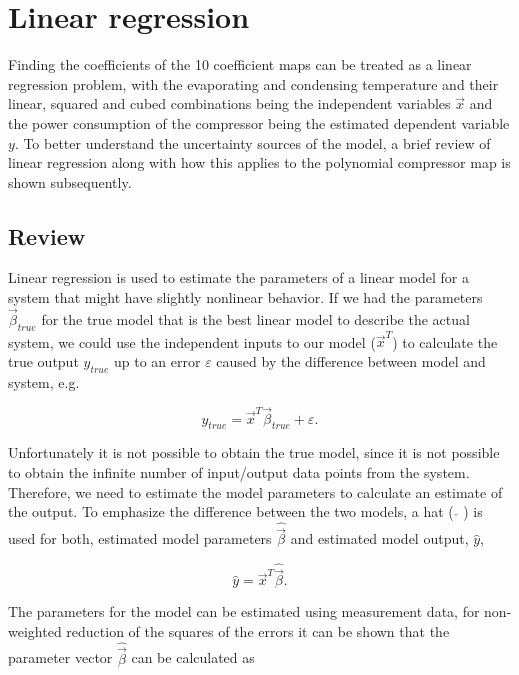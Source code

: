 \section{Linear regression}
\label{sec:linear_regression}
Finding the coefficients of the 10 coefficient maps can be treated as a linear regression problem, with the evaporating and condensing temperature and their linear, squared and cubed combinations being the independent variables ${\vec x}$ and the power consumption of the compressor being the estimated dependent variable $y$. To better understand the uncertainty sources of the model, a brief review of linear regression along with how this applies to the polynomial compressor map is shown subsequently.

\subsection{Review}
\label{sec:linreg_review}
Linear regression is used to estimate the parameters of a linear model for a system that might have slightly nonlinear behavior.  If we had the parameters ${\vec \beta _{true}} $ for the true model that is the best linear model to describe the actual system, we could use the independent inputs to our model (${\vec x^T}$) to calculate the true output $y_{true}$ up to an error $\varepsilon$ caused by the difference between model and system, e.g.

\begin{equation}
{y_{true}} = {\vec x^T}{\vec \beta _{true}} + \varepsilon.
\label{eq:true_lin_model}
\end{equation}

Unfortunately it is not possible to obtain the true model, since it is not possible to obtain the infinite number of input/output data points from the system. Therefore, we need to estimate the model parameters to calculate an estimate of the output. To emphasize the difference between the two models, a hat ( $\hat{}$ ) is used for both, estimated model parameters $\hat {\vec \beta}$ and estimated model output, $\hat y$,

\begin{equation}
\hat y = {\vec x^T}\hat {\vec \beta}.
\label{eq:estimted_lin_model}
\end{equation}

The parameters for the model can be estimated using measurement data, for non-weighted reduction of the squares of the errors it can be shown that the  parameter vector $\hat {\vec \beta}$ can be calculated as


